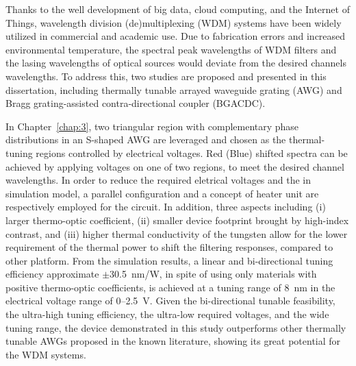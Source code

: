 \begin{abstract*}
    Thanks to the well development of big data, cloud computing, and the Internet of Things, 
    wavelength division (de)multiplexing (WDM) systems have been widely utilized in commercial and academic use. 
    Due to fabrication errors and increased environmental temperature, 
    the spectral peak wavelengths of WDM filters and the lasing wavelengths of optical sources would 
    deviate from the desired channels wavelengths. 
    To address this, 
    two studies are proposed and presented in this dissertation, 
    including thermally tunable arrayed waveguide grating (AWG) 
    and Bragg grating-assisted contra-directional coupler (BGACDC).
    
    In Chapter~\ref{chap:3}, 
    two triangular region with complementary phase distributions in an S-shaped AWG are leveraged and 
    chosen as the thermal-tuning regions controlled by electrical voltages. 
    Red (Blue) shifted spectra can be achieved by applying voltages on one of two regions, 
    to meet the desired channel wavelengths. 
    In order to reduce the required eletrical voltages and the  in simulation model, 
    a parallel configuration and a concept of heater unit are respectively employed for the circuit. 
    In addition, three aspects including 
    (i) larger thermo-optic coefficient, 
    (ii) smaller device footprint brought by high-index contrast, and 
    (iii) higher thermal conductivity of the tungsten allow for 
    the lower requirement of the thermal power to shift the filtering responses, compared to other platform. 
    From the simulation results, 
    a linear and bi-directional tuning efficiency approximate $\pm$30.5~nm/W, 
    in spite of using only materials with positive thermo-optic coefficients, 
    is achieved at a tuning range of 8~nm in the electrical voltage range of 0--2.5~V. 
    Given the bi-directional tunable feasibility, the ultra-high tuning efficiency, 
    the ultra-low required voltages, and the wide tuning range, 
    the device demonstrated in this study outperforms other thermally tunable AWGs proposed in the known literature, 
    showing its great potential for the WDM systems. 
    

\end{abstract*}
